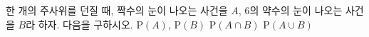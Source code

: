 한 개의 주사위를 던질 때, 짝수의 눈이 나오는 사건을 $A$, 6의 약수의 눈이 나오는 사건을 $B$라 하자. 다음을 구하시오.
 $\mathrm{P}(A)$, $\mathrm{P}(B)$
 $\mathrm{P}(A\cap B)$
 $\mathrm{P}(A\cup B)$
